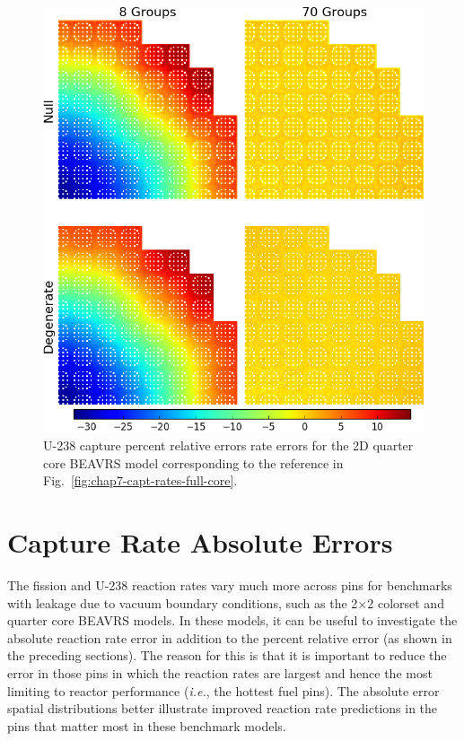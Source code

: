 \begin{appendices}
\begin{figure}[h!]
\centering
\includegraphics[width=\linewidth]{figures/quantification/appendix/full-core/capt-err}
\vspace{2mm}
\caption[U-238 capture rate errors for BEAVRS]{U-238 capture percent relative errors rate errors for the 2D quarter core \ac{BEAVRS} model corresponding to the reference in Fig.~\ref{fig:chap7-capt-rates-full-core}.}
\label{fig:quantify-full-core-capt-err}
\end{figure}

\clearpage

\section{Capture Rate Absolute Errors}
\label{sec:quantify-capt-rates-absolute}

The fission and U-238 reaction rates vary much more across pins for benchmarks with leakage due to vacuum boundary conditions, such as the 2$\times$2 colorset and quarter core \ac{BEAVRS} models. In these models, it can be useful to investigate the absolute reaction rate error in addition to the percent relative error (as shown in the preceding sections). The reason for this is that it is important to reduce the error in those pins in which the reaction rates are largest and hence the most limiting to reactor performance (\textit{i.e.}, the hottest fuel pins). The absolute error spatial distributions better illustrate improved reaction rate predictions in the pins that matter most in these benchmark models.


\end{appendices}
